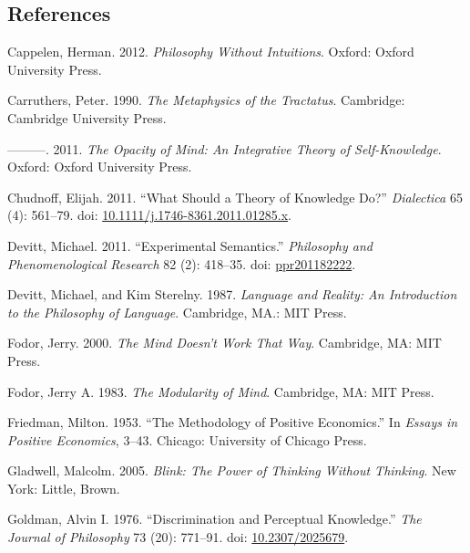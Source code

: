 \documentclass[
  11pt,
  letterpaper,
  DIV=11,
  numbers=noendperiod,
  twoside]{scrartcl}
\newlength{\cslhangindent}
\newenvironment{CSLReferences}[2] %
 {\begin{list}{}{%
  \setlength{\itemindent}{0pt}
  \setlength{\leftmargin}{0pt}
  \setlength{\parsep}{0pt}
  \ifodd #1
   \setlength{\leftmargin}{\cslhangindent}
   \setlength{\itemindent}{-1\cslhangindent}
  \fi
  \setlength{\itemsep}{#2\baselineskip}}}
 {\end{list}}
\begin{document}
\subsection*{References}\label{references}

\label{refs}
\begin{CSLReferences}{1}{0}
Cappelen, Herman. 2012. \emph{Philosophy Without Intuitions}. Oxford:
Oxford University Press.

Carruthers, Peter. 1990. \emph{The Metaphysics of the Tractatus}.
Cambridge: Cambridge University Press.

---------. 2011. \emph{The Opacity of Mind: An Integrative Theory of
Self-Knowledge}. Oxford: Oxford University Press.

Chudnoff, Elijah. 2011. {``What Should a Theory of Knowledge Do?''}
\emph{Dialectica} 65 (4): 561--79. doi:
\href{https://doi.org/10.1111/j.1746-8361.2011.01285.x}{10.1111/j.1746-8361.2011.01285.x}.

Devitt, Michael. 2011. {``Experimental Semantics.''} \emph{Philosophy
and Phenomenological Research} 82 (2): 418--35. doi:
\href{https://doi.org/ppr201182222}{ppr201182222}.

Devitt, Michael, and Kim Sterelny. 1987. \emph{Language and Reality: An
Introduction to the Philosophy of Language}. Cambridge, MA.: {MIT}
Press.

Fodor, Jerry. 2000. \emph{The Mind Doesn't Work That Way}. Cambridge,
MA: {MIT} Press.

Fodor, Jerry A. 1983. \emph{The Modularity of Mind}. Cambridge, MA: MIT
Press.

Friedman, Milton. 1953. {``The Methodology of Positive Economics.''} In
\emph{Essays in Positive Economics}, 3--43. Chicago: University of
Chicago Press.

Gladwell, Malcolm. 2005. \emph{Blink: The Power of Thinking Without
Thinking}. New York: Little, Brown.

Goldman, Alvin I. 1976. {``Discrimination and Perceptual Knowledge.''}
\emph{The Journal of Philosophy} 73 (20): 771--91. doi:
\href{https://doi.org/10.2307/2025679}{10.2307/2025679}.


\end{CSLReferences}
\end{document}

